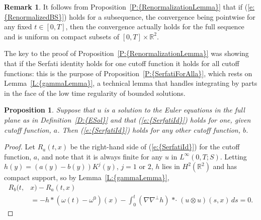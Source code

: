 \documentclass[reqno,openright,11pt,twoside]{amsart}
\newtheorem{prop}[theorem]{Proposition}
\theoremstyle{definition}
\newtheorem{remark}[theorem]{Remark}
\numberwithin{equation}{section}
\begin{document}
\begin{remark}\label{R:RenormalizationLemma}
	It follows from {Proposition~\ref{P:{RenormalizationLemma}}} that if {(\ref{e:{RenormalizedBS}})} holds for a subsequence,
	the convergence being pointwise for any fixed $t \in [0, T]$, then the convergence actually holds
	for the full sequence and is
	uniform on compact subsets of $[0, T] \times {\ensuremath{{\ensuremath{\mathbb{{R}}}}}}^2$.
\end{remark}

The key to the proof of {Proposition~\ref{P:{RenormalizationLemma}}} was showing that if the Serfati identity holds for one cutoff function it holds for all cutoff functions: this is the purpose of {Proposition~\ref{P:{SerfatiForAlla}}}, which rests on {Lemma~\ref{L:{gammaLemma}}}, a technical lemma that handles integrating by parts in the face of the low time regularity of bounded solutions.

\begin{prop}\label{P:SerfatiForAlla}
	Suppose that $u$ is a solution to the Euler equations in the full plane
	as in {Definition~\ref{D:{ESol}}} and that {(\ref{e:{SerfatiId}})} holds
	for one, given cutoff function, $a$.
	Then {(\ref{e:{SerfatiId}})} holds for any other cutoff function, $b$.
\end{prop}
\begin{proof}
	Let $R_a(t, x)$ be the right-hand side of {(\ref{e:{SerfatiId}})} for the cutoff
	function, $a$, and note that it is always finite for any $u$ in $L^{\ensuremath{\infty}}(0, T; S)$.
	Letting $h(y) = (a(y) - b(y)) K^j(y)$, $j = 1$ or $2$, $h$ lies in
	$H^2({\ensuremath{{\ensuremath{\mathbb{{R}}}}}}^2)$ and has compact support, so by {Lemma~\ref{L:{gammaLemma}}},
	\begin{align*}
		R_b(t, &x) - R_a(t, x) \\
			&= - h * (\omega(t) - \omega^0)(x)
				- \int_0^t ({\ensuremath{\nabla}} {\ensuremath{\nabla}}^\perp h) {\mathop{* \cdot}} (u \otimes u)(s, x) \, ds
			= 0.	
	\end{align*}
\end{proof}
\end{document}
